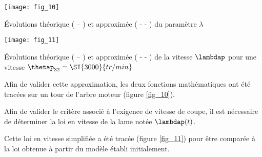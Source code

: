 \begin{marginfigure}
\texttt{[image: fig\_10]}
\caption{ Évolutions théorique ( -- ) et approximée ( - - ) du paramètre $\lambda$ \label{fig_10}}
\end{marginfigure}

\begin{marginfigure}
\texttt{[image: fig\_11]}
\caption{ Évolutions théorique ( -- ) et approximée ( - - ) de la vitesse $\lambdap$ pour une vitesse $\thetap_{32}=\SI{3000}{tr/min}$ \label{fig_11}}
\end{marginfigure}




Afin de valider cette approximation, les deux fonctions mathématiques ont été tracées sur un tour de l’arbre moteur (figure \ref{fig_10}).





Afin de valider le critère associé à l’exigence de vitesse de coupe, il est nécessaire de déterminer la loi en vitesse de la lame notée $\lambdap(t)$.


Cette loi en vitesse simplifiée a été tracée (figure \ref{fig_11}) pour être comparée à la loi obtenue à partir du modèle établi initialement.

